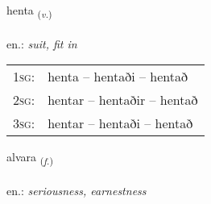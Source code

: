 \documentclass[frontgrid, backgrid]{flacards}\usepackage[]{graphicx}\usepackage[]{xcolor}
\begin{document}
\renewcommand{\flhead}{\vskip5pt \fboxsep=0pt {\small\bfseries\footnotesize Sagnorð | Verb}}
\renewcommand{\fcfoot}{\vskip5pt \fboxsep=0pt \hspace{2pt}{\small\bfseries\footnotesize 2K}}

\renewcommand{\blhead}{\vskip5pt {\small\bfseries\footnotesize Sagnorð | Verb }}
\renewcommand{\bcfoot}{\vskip5pt \hspace{2pt}{\small\bfseries\footnotesize 2K}}


{henta \small{\textsubscript{(\textit{v.})}} \\[1ex] %
\textphonetic{[hɛn̥ta]} \\
en.: \emph{suit, fit in} \\  [2ex]
\renewcommand*{\arraystretch}{0.8}
\begin{tabular}{p{1cm}l}
\textsc{1sg}: & henta -- hentaði -- hentað \\ 
\textsc{2sg}: & hentar -- hentaðir -- hentað \\ 
\textsc{3sg}: & hentar -- hentaði -- hentað \\ 
\end{tabular}
}

\renewcommand{\flhead}{\vskip5pt \fboxsep=0pt {\small\bfseries\footnotesize Nafnorð | Noun}}
\renewcommand{\fcfoot}{\vskip5pt \fboxsep=0pt \hspace{2pt}{\small\bfseries\footnotesize 2K}}

\renewcommand{\blhead}{\vskip5pt {\small\bfseries\footnotesize Nafnorð | Noun }}
\renewcommand{\bcfoot}{\vskip5pt \hspace{2pt}{\small\bfseries\footnotesize 2K}}


{alvara \small{\textsubscript{(\textit{f.})}} \\[1ex] %
\textphonetic{[alvara]} \\
en.: \emph{seriousness, earnestness} \\  [2ex]
\renewcommand*{\arraystretch}{0.8}
}
\end{document}
